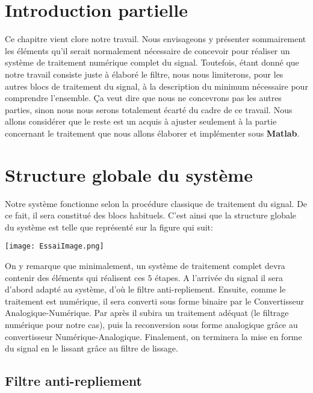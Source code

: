 \section{Introduction partielle}
Ce chapitre vient clore notre travail. Nous envisageons y présenter sommairement les éléments qu'il serait normalement nécessaire de concevoir pour réaliser un système de traitement numérique complet du signal. Toutefois, étant donné que notre travail consiste juste à élaboré le filtre, nous nous limiterons, pour les autres blocs de traitement du signal, à la description du minimum nécessaire pour comprendre l'ensemble. Ça veut dire que nous ne concevrons pas les autres parties, sinon nous nous serons totalement écarté du cadre de ce travail. Nous allons considérer que le reste est un acquis à ajuster seulement à la partie concernant le traitement que nous allons élaborer et implémenter sous \textbf{Matlab}.
\section{Structure globale du système}
Notre système fonctionne selon la procédure classique de traitement du signal. De ce fait, il sera constitué des blocs habituels. C'est ainsi que la structure globale du système est telle que représenté sur la figure qui suit:\newpage
\begin{center}
\texttt{[image: EssaiImage.png]}
\end{center}
On y remarque que minimalement, un système de traitement complet devra contenir des éléments qui réalisent ces $ 5 $ étapes. A l'arrivée du signal il sera d'abord adapté au système, d'où le filtre anti-repliement. Ensuite, comme le traitement est numérique, il sera converti sous forme binaire par le Convertisseur Analogique-Numérique. Par après il subira un traitement adéquat (le filtrage numérique pour notre cas), puis la reconversion sous forme analogique grâce au convertisseur Numérique-Analogique. Finalement, on terminera la mise en forme du signal en le lissant grâce au filtre de lissage.
\subsection{Filtre anti-repliement}
